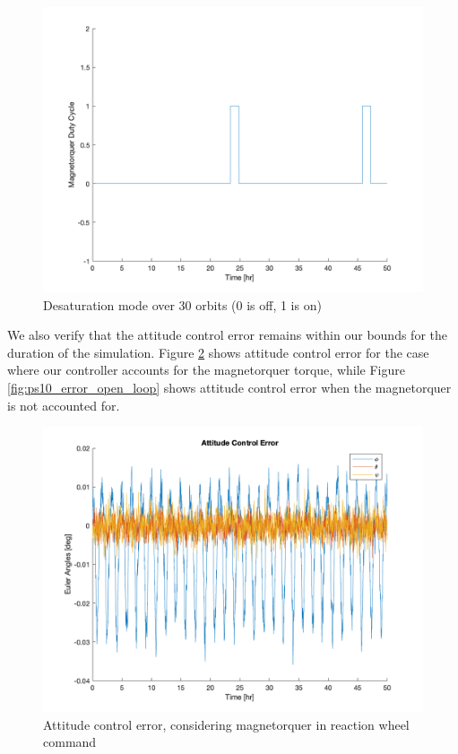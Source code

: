 \begin{figure}[H]
\centering
\includegraphics[scale=0.25]{Images/ps10_desaturation_mode.png}
\caption{Desaturation mode over 30 orbits (0 is off, 1 is on)}
\label{fig:ps10_desaturation_mode}
\end{figure}

We also verify that the attitude control error remains within our bounds for the duration of the simulation. Figure \ref{fig:ps10_error_closed_loop} shows attitude control error for the case where our controller accounts for the magnetorquer torque, while Figure \ref{fig:ps10_error_open_loop} shows attitude control error when the magnetorquer is not accounted for.

\begin{figure}[H]
\centering
\includegraphics[scale=0.3]{Images/ps10_error_closed_loop.png}
\caption{Attitude control error, considering magnetorquer in reaction wheel command}
\label{fig:ps10_error_closed_loop}
\end{figure}

